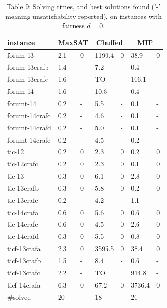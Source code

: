 \documentclass[10pt]{article}
\begin{document}
\begin{table}[h]
\begin{center}
\captionsetup{labelformat=empty}
\caption{Table 9: Solving times, and best solutions found ('-' meaning unsatisfiability reported), on instances with fairness $d=0$.}
\begin{tabular}{|l|l|l|l|l|l|l|}
\hline
instance & \multicolumn{2}{|c|}{MaxSAT} & \multicolumn{2}{|c|}{Chuffed} & \multicolumn{2}{|c|}{MIP} \\
\hline
forum-13 & 2.1 & 0 & 1190.4 & 0 & 38.9 & 0 \\
\hline
forum-13crafb & 1.4 & - & 7.2 & - & 0.4 & - \\
\hline
forum-13crafc & 1.6 & - & TO &  & 106.1 & - \\
\hline
forum-14 & 1.6 & - & 10.8 & - & 0.4 & - \\
\hline
forumt-14 & 0.2 & - & 5.5 & - & 0.1 & - \\
\hline
forumt-14crafc & 0.2 & - & 4.6 & - & 0.1 & - \\
\hline
forumt-14crafd & 0.2 & - & 5.0 & - & 0.1 & - \\
\hline
forumt-14crafe & 0.2 & - & 4.5 & - & 0.2 & - \\
\hline
tic-12 & 0.2 & 0 & 2.3 & 0 & 0.2 & 0 \\
\hline
tic-12crafc & 0.2 & 0 & 2.3 & 0 & 0.1 & 0 \\
\hline
tic-13 & 0.3 & 0 & 6.1 & 0 & 2.8 & 0 \\
\hline
tic-13crafb & 0.3 & 0 & 5.8 & 0 & 0.2 & 0 \\
\hline
tic-13crafc & 0.2 & - & 4.2 & - & 1.1 & - \\
\hline
tic-14crafa & 0.6 & 0 & 5.6 & 0 & 0.6 & 0 \\
\hline
tic-14crafc & 0.6 & 0 & 4.5 & 0 & 2.6 & 0 \\
\hline
tic-14crafd & 0.3 & 0 & 5.5 & 0 & 0.8 & 0 \\
\hline
ticf-13crafa & 2.3 & 0 & 3595.5 & 0 & 38.4 & 0 \\
\hline
ticf-13crafb & 1.5 & - & 8.4 & - & 0.6 & - \\
\hline
ticf-13crafc & 2.2 & - & TO &  & 914.8 & - \\
\hline
ticf-14crafa & 6.3 & 0 & 67.2 & 0 & 3736.4 & 0 \\
\hline
\#solved & 20 &  & 18 &  & 20 &  \\
\hline
\end{tabular}
\end{center}
\end{table}
\end{document}
